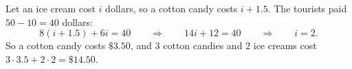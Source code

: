Let an ice cream cost $i$ dollars, so a cotton candy costs $i+1.5$. The tourists paid $50-10=40$ dollars:
\[8(i+1.5)+6i=40\qquad\Longrightarrow\qquad14i+12=40\qquad\Longrightarrow\qquad i=2.\]
So a cotton candy costs $\$3.50$, and $3$ cotton candies and $2$ ice creams cost $3\cdot3.5+2\cdot2=\boxed{\$14.50}$.
